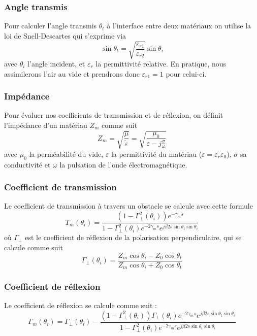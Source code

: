 \subsubsection*{Angle transmis}

Pour calculer l'angle transmis $\theta_t$ {\`a} l'interface entre deux
mat{\'e}riaux on utilise la loi de Snell-Descartes qui s'exprime via 
\[ \sin \theta_t = \sqrt{\frac{\varepsilon_{r 1}}{\varepsilon_{r 2}}} \sin \theta_i
\]
avec $\theta_i$ l'angle incident, et $\varepsilon_r$ la permittivit{\'e}
relative. En pratique, nous assimilerons l'air au vide et prendrons donc
$\varepsilon_{r1} = 1$ pour celui-ci.

\subsubsection*{Imp{\'e}dance}

Pour {\'e}valuer nos coefficients de transmission et de r{\'e}flexion, on
d{\'e}finit l'imp{\'e}dance d'un mat{\'e}riau $Z_m$ comme suit
\[ Z_m = \sqrt{\frac{\mu}{\tilde{\varepsilon}}} = \sqrt{\frac{\mu_0}{\varepsilon - j
   \frac{\sigma}{\omega}}} \]
avec $\mu_0$ la perm{\'e}abilit{\'e} du vide, $\varepsilon$ la permittivit{\'e}
du mat{\'e}riau ($\varepsilon=\varepsilon_r\varepsilon_0$), $\sigma$ sa conductivit{\'e} et $\omega$ la pulsation de
l'onde {\'e}lectromagn{\'e}tique.

\subsubsection*{Coefficient de transmission}

Le coefficient de transmission {\`a} travers un obstacle se calcule avec cette
formule
\[ T_m (\theta_i) = \frac{(1 - \Gamma_{\perp}^2 (\theta_i)) e^{- \gamma_m
   s}}{1 - \Gamma_{\perp}^2 (\theta_i) e^{- 2 \gamma_m s} e^{j \beta 2 s \sin
   \theta_t \sin \theta_i}} \]
o{\`u} $\Gamma_{\perp}$ est le coefficient de r{\'e}flexion de la polarisation
perpendiculaire, qui se calcule comme suit
\[ \Gamma_{\perp} (\theta_i) = \frac{Z_m \cos \theta_i - Z_0 \cos
   \theta_t}{Z_m \cos \theta_i + Z_0 \cos \theta_t} \]

\subsubsection*{Coefficient de r{\'e}flexion}

Le coefficient de r{\'e}flexion se calcule comme suit :
\[ \Gamma_m (\theta_i) = \Gamma_{\perp} (\theta_i) - \frac{(1 -
   \Gamma_{\perp}^2 (\theta_i)) \Gamma_{\perp} (\theta_i) e^{- 2 \gamma_m s}
   e^{j \beta 2 s \sin \theta_t \sin \theta_i}}{1 - \Gamma_{\perp}^2
   (\theta_i) e^{- 2 \gamma_m s} e^{j \beta 2 s \sin \theta_t \sin \theta_i}}
\]


